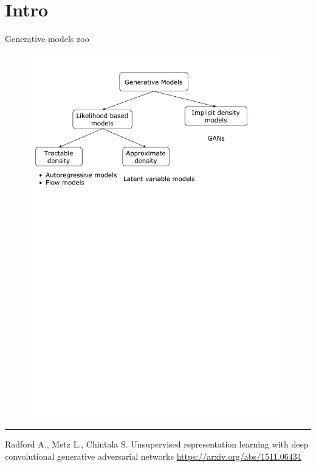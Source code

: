 

\begin{frame}
\titlepage
\end{frame}
\section{Intro}
\begin{frame}{Generative models zoo}
    \begin{figure}
        \centering
        \includegraphics[width=1.0\linewidth]{figs/generative_models_zoo.pdf}
        \label{fig:generative_models_zoo}
    \end{figure}
\vfill
\hrule\medskip
{\scriptsize Radford A., Metz L., Chintala S. Unsupervised representation learning with deep convolutional generative adversarial networks  \href{https://arxiv.org/abs/1511.06434}{https://arxiv.org/abs/1511.06434}}
\end{frame}
